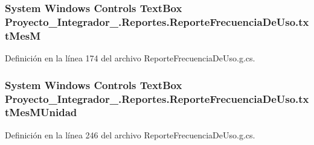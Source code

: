 \hypertarget{class_proyecto___integrador__3_1_1_reportes_1_1_reporte_frecuencia_de_uso_a09866a06c2de29cae45eec70baaa743c}{
\subsubsection[{txt\-Mes\-M}]{\setlength{\rightskip}{0pt plus 5cm}System Windows Controls Text\-Box Proyecto\-\_\-\-Integrador\-\_.\-Reportes.\-Reporte\-Frecuencia\-De\-Uso.\-txt\-Mes\-M\hspace{0.3cm}{\ttfamily [package]}}}\label{class_proyecto___integrador__3_1_1_reportes_1_1_reporte_frecuencia_de_uso_a09866a06c2de29cae45eec70baaa743c}


Definición en la línea 174 del archivo Reporte\-Frecuencia\-De\-Uso.\-g.\-cs.

\hypertarget{class_proyecto___integrador__3_1_1_reportes_1_1_reporte_frecuencia_de_uso_ae9d8312f5f3d8cef187f25210a97ad43}{
\subsubsection[{txt\-Mes\-M\-Unidad}]{\setlength{\rightskip}{0pt plus 5cm}System Windows Controls Text\-Box Proyecto\-\_\-\-Integrador\-\_.\-Reportes.\-Reporte\-Frecuencia\-De\-Uso.\-txt\-Mes\-M\-Unidad\hspace{0.3cm}{\ttfamily [package]}}}\label{class_proyecto___integrador__3_1_1_reportes_1_1_reporte_frecuencia_de_uso_ae9d8312f5f3d8cef187f25210a97ad43}


Definición en la línea 246 del archivo Reporte\-Frecuencia\-De\-Uso.\-g.\-cs.

